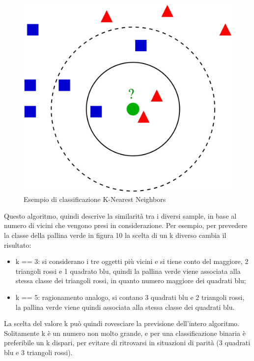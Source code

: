 \documentclass[12pt,a4paper]{article}
\begin{document}
\begin{figure}[h]
    \centering
    \includegraphics[scale=0.07]{KnnClassification.png}
    \caption{Esempio di classificazione K-Nearest Neighbors}
\end{figure}

Questo algoritmo, quindi descrive la similarità tra i diversi sample, in base al numero di vicini che vengono presi in considerazione. Per esempio, per prevedere la classe della pallina verde in figura 10 la scelta di un k diverso cambia il risultato:
\begin{itemize}
    \item k == 3: si considerano i tre oggetti più vicini e si tiene conto del maggiore, 2 triangoli rossi e 1 quadrato blu, quindi la pallina verde viene associata alla stessa classe dei triangoli rossi, in quanto numero maggiore dei quadrati blu;
    \item k == 5: ragionamento analogo, si contano 3 quadrati blu e 2 triangoli rossi, la pallina verde viene quindi associata alla stessa classe dei quadrati blu.
\end{itemize}

La scelta del valore k può quindi rovesciare la previsione dell'intero algoritmo. Solitamente k è un numero non molto grande, e per una classificazione binaria è preferibile un k dispari, per evitare di ritrovarsi in situazioni di parità (3 quadrati blu e 3 triangoli rossi). \hfill \break
\end{document}
